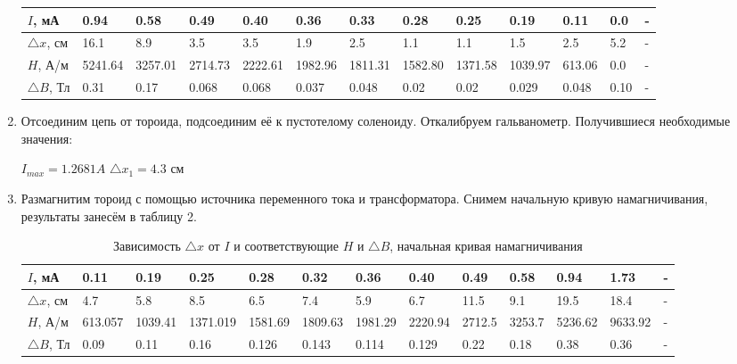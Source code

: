 \documentclass[a4paper]{article}
\begin{document}
\begin{enumerate}
\begin{table}[h]
\begin{tabular}{ |p{1.2cm}||p{1cm}|p{1cm}|p{1cm}|p{1cm}|p{1cm}|p{1cm}|p{1cm}|p{1cm}|p{1cm}|p{1cm}|p{1cm}|p{1cm}| }
    $I$, мА & 0.94 & 0.58 & 0.49 & 0.40 & 0.36 & 0.33 & 0.28 & 0.25 & 0.19 & 0.11 & 0.0 & - \\
\hline
    $\triangle x$, см & 16.1 & 8.9 & 3.5 & 3.5 & 1.9 & 2.5 & 1.1 & 1.1 & 1.5 & 2.5 & 5.2 & -\\
\hline
    $H$, А/м & 5241.64 & 3257.01 & 2714.73 & 2222.61 & 1982.96 & 1811.31 & 1582.80 & 1371.58 & 1039.97 & 613.06 & 0.0 & -\\
\hline
    $\triangle B$, Тл & 0.31 & 0.17 & 0.068 & 0.068 & 0.037 & 0.048 & 0.02 & 0.02 & 0.029 & 0.048 & 0.10 & -\\
\hline
\hline
    \end{tabular}
\end{table}
    
\item Отсоединим цепь от тороида, подсоединим её к пустотелому соленоиду. Откалибруем гальванометр. Получившиеся необходимые значения:

\begin{center}
    $I_{max}  = 1.2681 A$ \hspace{1cm} $\triangle x_{1} = 4.3$ см
\end{center}

\item Размагнитим тороид с помощью источника переменного тока и трансформатора. Снимем начальную кривую намагничивания, результаты занесём в таблицу 2.

   \begin{table}[h]
    \centering
    \begin{center}
    \caption{Зависимость $\triangle x$ от $I$ и соответствующие $H$ и $\triangle B$, начальная кривая намагничивания}
    \end{center}
    \vspace{0.1cm}
    \label{tab:my_label}
    \begin{tabular}{ |p{1.2cm}||p{1cm}|p{1cm}|p{1cm}|p{1cm}|p{1cm}|p{1cm}|p{1cm}|p{1cm}|p{1cm}|p{1cm}|p{1cm}|p{1cm}| }
 \hline
    $I$, мА & 0.11 & 0.19 & 0.25 & 0.28 & 0.32 & 0.36 & 0.40 & 0.49 & 0.58 & 0.94 & 1.73 & -\\
\hline
    $\triangle x$, см & 4.7 & 5.8 & 8.5 & 6.5 & 7.4 & 5.9 & 6.7 & 11.5 & 9.1 & 19.5 & 18.4 &  -\\
\hline
    $H$, А/м & 613.057 & 1039.41 & 1371.019 & 1581.69 & 1809.63 & 1981.29 & 2220.94 & 2712.5 & 3253.7 & 5236.62 & 9633.92 & - \\
\hline
    $\triangle B$, Тл & 0.09 & 0.11 & 0.16 & 0.126 & 0.143 & 0.114 & 0.129 & 0.22 & 0.18 & 0.38 & 0.36 & - \\
\hline
\hline


\end{tabular}
\end{table}
\end{enumerate}
\end{document}
